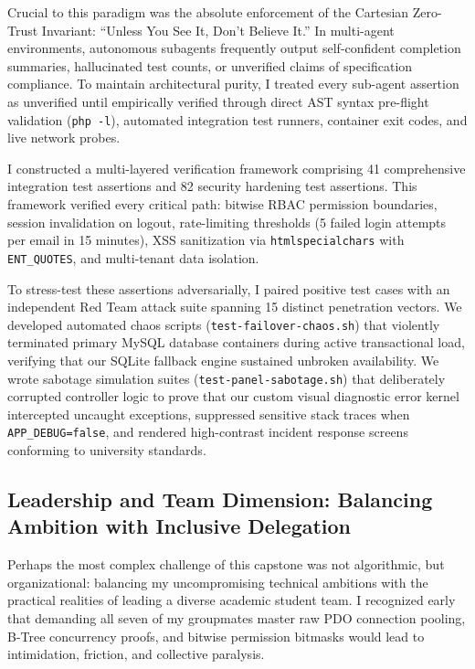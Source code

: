 Crucial to this paradigm was the absolute enforcement of the Cartesian Zero-Trust Invariant: ``Unless You See It, Don't Believe It.'' In multi-agent environments, autonomous subagents frequently output self-confident completion summaries, hallucinated test counts, or unverified claims of specification compliance. To maintain architectural purity, I treated every sub-agent assertion as unverified until empirically verified through direct AST syntax pre-flight validation (\texttt{php -l}), automated integration test runners, container exit codes, and live network probes.

I constructed a multi-layered verification framework comprising 41 comprehensive integration test assertions and 82 security hardening test assertions. This framework verified every critical path: bitwise RBAC permission boundaries, session invalidation on logout, rate-limiting thresholds (5 failed login attempts per email in 15 minutes), XSS sanitization via \texttt{htmlspecialchars} with \texttt{ENT\_QUOTES}, and multi-tenant data isolation.

To stress-test these assertions adversarially, I paired positive test cases with an independent Red Team attack suite spanning 15 distinct penetration vectors. We developed automated chaos scripts (\texttt{test-failover-chaos.sh}) that violently terminated primary MySQL database containers during active transactional load, verifying that our SQLite fallback engine sustained unbroken availability. We wrote sabotage simulation suites (\texttt{test-panel-sabotage.sh}) that deliberately corrupted controller logic to prove that our custom visual diagnostic error kernel intercepted uncaught exceptions, suppressed sensitive stack traces when \texttt{APP\_DEBUG=false}, and rendered high-contrast incident response screens conforming to university standards.

\subsection{Leadership and Team Dimension: Balancing Ambition with Inclusive Delegation}
Perhaps the most complex challenge of this capstone was not algorithmic, but organizational: balancing my uncompromising technical ambitions with the practical realities of leading a diverse academic student team. I recognized early that demanding all seven of my groupmates master raw PDO connection pooling, B-Tree concurrency proofs, and bitwise permission bitmasks would lead to intimidation, friction, and collective paralysis.

